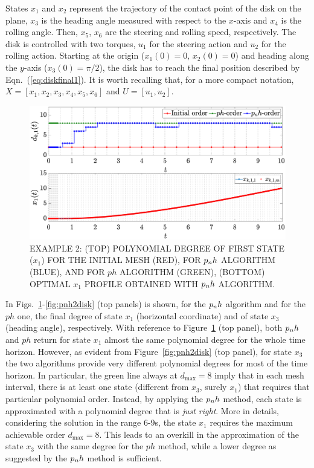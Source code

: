 States $x_1$ and $x_2$ represent the trajectory of the contact point of the disk on the plane, $x_3$ is the heading angle measured with respect to
the $x$-axis and $x_4$ is the rolling angle. Then, $x_5$, $x_6$ are the steering and rolling speed, respectively.
The disk is controlled with two torques, $u_1$ for the steering action and $u_2$ for the rolling action. Starting at the origin ($x_1(0) = 0, \, x_2(0) = 0$) and heading along the $y$-axis ($x_3(0) = \pi/2$), the disk has to reach the final position described by
Eqn.~(\ref{eq:diskfinal1}). It is worth recalling that, for a more compact notation, $X = [x_1, x_2, x_3, x_4, x_5, x_6]$  and $U = [u_1, u_2]$.
\begin{figure}[t]
	\centering
	\includegraphics[trim={1cm 0.1cm 2cm 1.05cm},clip,width=1\columnwidth]{Img/pnh1_disk1}
	\caption{EXAMPLE 2: (TOP) POLYNOMIAL DEGREE OF FIRST STATE ($x_{1}$) FOR THE INITIAL MESH (RED), FOR $p_{n}h$ ALGORITHM (BLUE), AND FOR $ph$ ALGORITHM (GREEN), (BOTTOM)
		OPTIMAL $x_1$ PROFILE OBTAINED WITH $p_{n}h$ ALGORITHM.}
	\label{fig:pnh1disk}
\end{figure}
In Figs.~\ref{fig:pnh1disk}-\ref{fig:pnh2disk} (top panels) is shown, for the $p_{n}h$ algorithm and for the $ph$ one, the final degree of state $x_1$ (horizontal coordinate) and of state $x_3$ (heading angle), respectively.
With reference to Figure~\ref{fig:pnh1disk} (top panel), both $p_{n}h$ and $ph$ return for state $x_1$ almost the same polynomial degree for the whole time horizon. However, as evident from Figure~\ref{fig:pnh2disk} (top panel), for state $x_3$ the two algorithms provide very different polynomial degrees for most of the time horizon.
In particular, the green line always at $d_{\max}=8$ imply that in each mesh interval, there is at least one state (different from $x_3$, surely $x_1$) that requires that particular polynomial order. Instead, by applying the $p_{n}h$ method, each state is approximated with a polynomial degree that is \emph{just right}.
More in details, considering the solution in the range 6-9s, the state $x_1$ requires the maximum achievable order $d_\text{max} = 8$. This leads to an overkill in the approximation of the state $x_3$ with the same degree for the $ph$ method, while a lower degree as suggested by the $p_{n}h$ method is sufficient.

